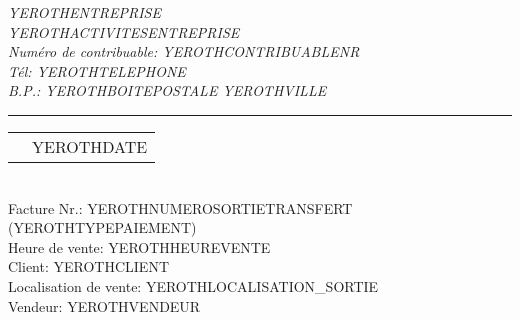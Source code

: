 \documentclass[1.75pt]{article} %
\makeatletter
\newcommand{\headerrow}[2]
{\begin{tabular*}{\linewidth}{l@{\extracolsep{\fill}}r}
	#1 &
	#2 \\
\end{tabular*}}
\makeatother
\begin{document}
\emph{YEROTHENTREPRISE} \\
\emph{YEROTHACTIVITESENTREPRISE} \\
\emph{Num\'ero de contribuable: YEROTHCONTRIBUABLENR} \\
\emph{T\'el: YEROTHTELEPHONE} \\
\emph{B.P.: YEROTHBOITEPOSTALE YEROTHVILLE}

\vspace*{0.2cm}

\hrule

\headerrow
{}
{YEROTHDATE}\\

Facture Nr.: YEROTHNUMEROSORTIETRANSFERT (YEROTHTYPEPAIEMENT)\\
Heure de vente: YEROTHHEUREVENTE\\
Client: YEROTHCLIENT\\
Localisation de vente: YEROTHLOCALISATION_SORTIE\\
Vendeur: YEROTHVENDEUR
\vspace*{0.2cm}

\end{document}
